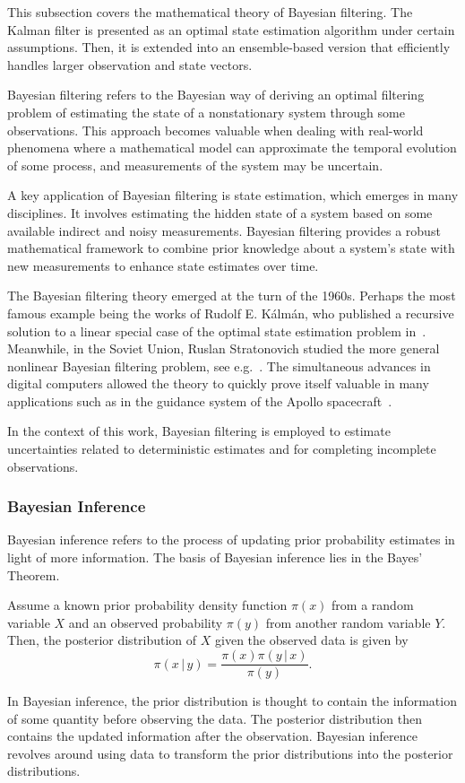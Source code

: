 This subsection covers the mathematical theory of Bayesian filtering.
The Kalman filter is presented as an optimal state estimation algorithm under certain assumptions.
Then, it is extended into an ensemble-based version that efficiently handles larger observation and state vectors.

Bayesian filtering refers to the Bayesian way of deriving an optimal filtering problem of estimating the state of a nonstationary system through some observations.
This approach becomes valuable when dealing with real-world phenomena where a mathematical model can approximate the temporal evolution of some process, and measurements of the system may be uncertain.

A key application of Bayesian filtering is state estimation, which emerges in many disciplines.
It involves estimating the hidden state of a system based on some available indirect and noisy measurements.
Bayesian filtering provides a robust mathematical framework to combine prior knowledge about a system's state with new measurements to enhance state estimates over time.

The Bayesian filtering theory emerged at the turn of the 1960s.
Perhaps the most famous example being the works of Rudolf E. Kálmán, who published a recursive solution to a linear special case of the optimal state estimation problem in~\cite{kalman}.
Meanwhile, in the Soviet Union, Ruslan Stratonovich studied the more general nonlinear Bayesian filtering problem, see e.g.~\cite{stratonovich2, stratonovich1}.
The simultaneous advances in digital computers allowed the theory to quickly prove itself valuable in many applications such as in the guidance system of the Apollo spacecraft~\cite{mcgee}.

In the context of this work, Bayesian filtering is employed to estimate uncertainties related to deterministic estimates and for completing incomplete observations.

\subsubsection{Bayesian Inference}
Bayesian inference refers to the process of updating prior probability estimates in light of more information.
The basis of Bayesian inference lies in the Bayes' Theorem.
\begin{theorem}
    Assume a known prior probability density function $\pi(x)$ from a random variable $X$ and an observed probability $\pi(y)$ from another random variable $Y$.
    Then, the posterior distribution of $X$ given the observed data is given by
    \begin{equation*}
        \pi(x \, \vert \, y) = \frac{\pi(x) \pi(y \, \vert \, x)}{\pi(y)}.
    \end{equation*}
\end{theorem}
In Bayesian inference, the prior distribution is thought to contain the information of some quantity before observing the data.
The posterior distribution then contains the updated information after the observation.
Bayesian inference revolves around using data to transform the prior distributions into the posterior distributions.


